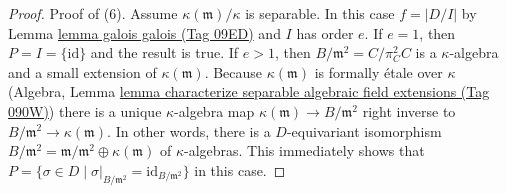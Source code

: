 \documentclass{amsart}
\theoremstyle{plain}
\theoremstyle{definition}
\theoremstyle{remark}
\numberwithin{equation}{subsection}
\begin{document}
\begin{proof}
\medskip\noindent
Proof of (6). Assume $\kappa(\mathfrak m)/\kappa$ is separable.
In this case $f = |D/I|$ by Lemma \href{https://stacks.math.columbia.edu/tag/09ED}{lemma galois galois (Tag 09ED)}
and $I$ has order $e$. If $e = 1$, then $P = I = \{\text{id}\}$
and the result is true. If $e > 1$, then
$B/\mathfrak m^2 = C/\pi_C^2C$ is a $\kappa$-algebra
and a small extension of $\kappa(\mathfrak m)$.
Because $\kappa(\mathfrak m)$ is formally \'etale over $\kappa$
(Algebra, Lemma
\href{https://stacks.math.columbia.edu/tag/090W}{lemma characterize separable algebraic field extensions (Tag 090W)})
there is a unique $\kappa$-algebra map
$\kappa(\mathfrak m) \to B/\mathfrak m^2$
right inverse to $B/\mathfrak m^2 \to \kappa(\mathfrak m)$.
In other words, there is a $D$-equivariant isomorphism
$B/\mathfrak m^2 = \mathfrak m/\mathfrak m^2 \oplus \kappa(\mathfrak m)$
of $\kappa$-algebras. This immediately shows that
$P =
\{\sigma \in D \mid \sigma|_{B/\mathfrak m^2} = \text{id}_{B/\mathfrak m^2}\}$
in this case.
\end{proof}
\end{document}
